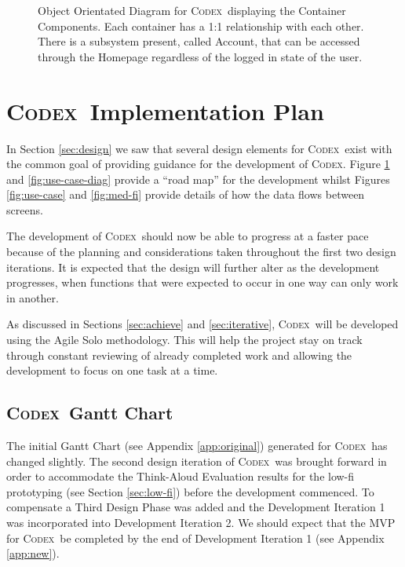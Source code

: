\documentclass[progress]{cmpreport}
\newcommand{\Codex}{\textsc{Codex}}
\begin{document}
		\begin{figure}
			\centering
			\caption{Object Orientated Diagram for \Codex \ displaying the Container Components. Each container has a 1:1 relationship with each other. There is a subsystem present, called Account, that can be accessed through the Homepage regardless of the logged in state of the user.} \label{fig:ood-views}
		\end{figure}
	
	\section{\Codex \ Implementation Plan} \label{sec:development}
	In Section \ref{sec:design} we saw that several design elements for \Codex \ exist with the common goal of providing guidance for the development of \Codex. Figure \ref{fig:ood-views} and \ref{fig:use-case-diag} provide a ``road map'' for the development whilst Figures \ref{fig:use-case} and \ref{fig:med-fi} provide details of how the data flows between screens.
	
	The development of \Codex \ should now be able to progress at a faster pace because of the planning and considerations taken throughout the first two design iterations. It is expected that the design will further alter as the development progresses, when functions that were expected to occur in one way can only work in another.
	
	As discussed in Sections \ref{sec:achieve} and \ref{sec:iterative}, \Codex \ will be developed using the Agile Solo methodology. This will help the project stay on track through constant reviewing of already completed work and allowing the development to focus on one task at a time.
	
		\subsection{\Codex \ Gantt Chart} \label{sec:gantt}
		The initial Gantt Chart (see Appendix \ref{app:original}) generated for \Codex \ has changed slightly. The second design iteration of \Codex \ was brought forward in order to accommodate the Think-Aloud Evaluation results for the low-fi prototyping (see Section \ref{sec:low-fi}) before the development commenced. To compensate a Third Design Phase was added and the Development Iteration 1 was incorporated into Development Iteration 2. We should expect that the MVP for \Codex \ be completed by the end of Development Iteration 1 (see Appendix \ref{app:new}).
		
\end{document}
